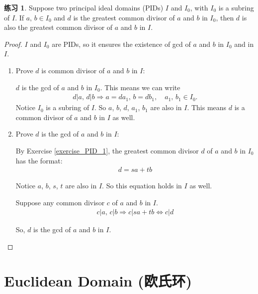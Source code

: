 \documentclass[utf8]{ctexbook}
\theoremstyle{definition}
\newtheorem{exercise}{练习}[section]
\begin{document}
\begin{exercise}
Suppose two principal ideal domains (PIDs) $I$ and $I_0$, with $I_0$ is a subring of $I$. If $a, \, b \in I_0$ and $d$ is the greatest common divisor of $a$ and $b$ in $I_0$, then $d$ is also the greatest common divisor of $a$ and $b$ in $I$.
\end{exercise}

\begin{proof}
$I$ and $I_0$ are PIDs, so it ensures the existence of gcd of $a$ and $b$ in $I_0$ and in $I$. 

\begin{enumerate}

\item{Prove $d$ is common divisor of $a$ and $b$ in $I$: 

$d$ is the gcd of $a$ and $b$ in $I_0$. This means we can write
\begin{align*}
d | a, \, d | b \Longrightarrow a = d a_1, \, b = d b_1, \quad a_1, \, b_1 \in I_0 .
\end{align*}
Notice $I_0$ is a subring of $I$. So $a$, $b$, $d$, $a_1$, $b_1$ are also in $I$. This means $d$ is a common divisor of $a$ and $b$ in $I$ as well.
}
\item{Prove $d$ is the gcd of $a$ and $b$ in $I$:

By Exercise \ref{exercise_PID_1}, the greatest common divisor $d$ of $a$ and $b$ in $I_0$ has the format:
\begin{align*}
d = s a + t b
\end{align*}

Notice $a$, $b$, $s$, $t$ are also in $I$. So this equation holds in $I$ as well. 

Suppose any common divisor $c$ of $a$ and $b$ in $I$. 
\begin{align*}
c | a ,\, c | b \Longrightarrow c | sa + t b \Longleftrightarrow c | d
\end{align*} 

So, $d$ is the gcd of $a$ and $b$ in $I$.
}
\end{enumerate}


\end{proof}

\section{Euclidean Domain (欧氏环)}
\end{document}
